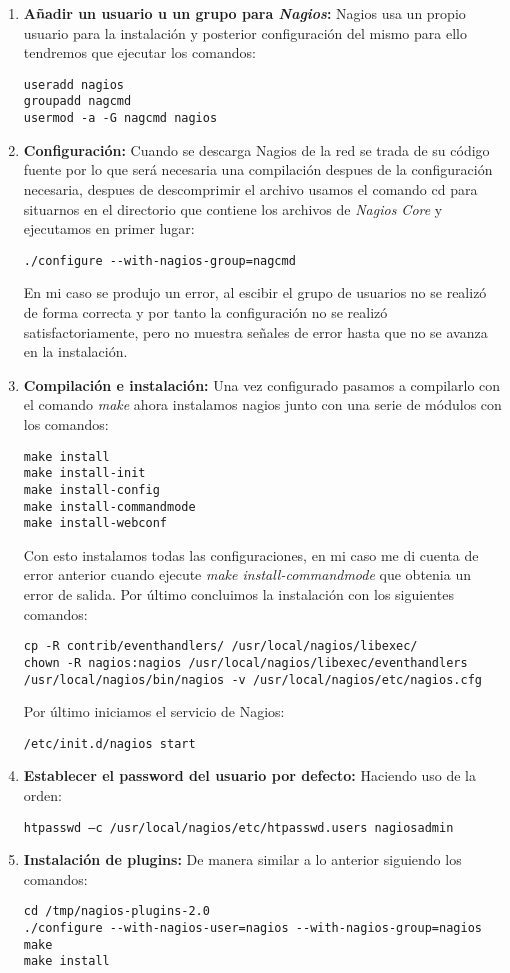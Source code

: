 \documentclass[a4paper, 10pt]{article} %
\begin{document}
\begin{enumerate}
\item \textbf{Añadir un usuario u un grupo para \textit{Nagios}:} Nagios usa un propio usuario para la instalación y posterior configuración del mismo para ello tendremos que ejecutar los comandos:
\begin{verbatim}
useradd nagios
groupadd nagcmd
usermod -a -G nagcmd nagios
\end{verbatim}
\item \textbf{Configuración:} Cuando se descarga Nagios de la red se trada de su código fuente por lo que será necesaria una compilación despues de la configuración necesaria, despues de descomprimir el archivo usamos el comando cd para situarnos en el directorio que contiene los archivos de \textit{Nagios Core} y ejecutamos en primer lugar:
\begin{verbatim}
./configure --with-nagios-group=nagcmd
\end{verbatim}
En mi caso se produjo un error, al escibir el grupo de usuarios no se realizó de forma correcta y por tanto la configuración no se realizó satisfactoriamente, pero no muestra señales de error hasta que no se avanza en la instalación.
\item \textbf{Compilación e instalación:} Una vez configurado pasamos a compilarlo con el comando \textit{make} ahora instalamos nagios junto con una serie de módulos con los comandos:
\begin{verbatim}
make install
make install-init
make install-config
make install-commandmode
make install-webconf
\end{verbatim}
Con esto instalamos todas las configuraciones, en mi caso me di cuenta de error anterior cuando ejecute \textit{make install-commandmode} que obtenia un error de salida. Por último concluimos la instalación con los siguientes comandos:
\begin{verbatim}
cp -R contrib/eventhandlers/ /usr/local/nagios/libexec/
chown -R nagios:nagios /usr/local/nagios/libexec/eventhandlers
/usr/local/nagios/bin/nagios -v /usr/local/nagios/etc/nagios.cfg
\end{verbatim}
Por último iniciamos el servicio de Nagios:
\begin{verbatim}
/etc/init.d/nagios start
\end{verbatim}
\item \textbf{Establecer el password del usuario por defecto:} Haciendo uso de la orden:
\begin{verbatim}
htpasswd –c /usr/local/nagios/etc/htpasswd.users nagiosadmin
\end{verbatim}
\item \textbf{Instalación de plugins:} De manera similar a lo anterior siguiendo los comandos:
\begin{verbatim}
cd /tmp/nagios-plugins-2.0
./configure --with-nagios-user=nagios --with-nagios-group=nagios
make
make install
\end{verbatim}
\end{enumerate}
\end{document}
